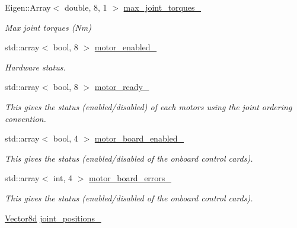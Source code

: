 \begin{DoxyCompactItemize}
Eigen\+::\+Array$<$ double, 8, 1 $>$ \hyperlink{classblmc__robots_1_1Solo8TI_a9eca8246a28a6f2f2d1deff52228e69f}{max\+\_\+joint\+\_\+torques\+\_\+}
\begin{DoxyCompactList}\small\item\em Max joint torques (Nm) \end{DoxyCompactList}\item 
std\+::array$<$ bool, 8 $>$ \hyperlink{classblmc__robots_1_1Solo8TI_a3dbd4bd26b5a4273e94ced22d43a9890}{motor\+\_\+enabled\+\_\+}
\begin{DoxyCompactList}\small\item\em Hardware status. \end{DoxyCompactList}\item 
\mbox{\label{classblmc__robots_1_1Solo8TI_a604140f307df2c420c29990948fdbd38}} 
std\+::array$<$ bool, 8 $>$ \hyperlink{classblmc__robots_1_1Solo8TI_a604140f307df2c420c29990948fdbd38}{motor\+\_\+ready\+\_\+}
\begin{DoxyCompactList}\small\item\em This gives the status (enabled/disabled) of each motors using the joint ordering convention. \end{DoxyCompactList}\item 
\mbox{\label{classblmc__robots_1_1Solo8TI_a9471bb2684e782adfc1a8db58ba9c18e}} 
std\+::array$<$ bool, 4 $>$ \hyperlink{classblmc__robots_1_1Solo8TI_a9471bb2684e782adfc1a8db58ba9c18e}{motor\+\_\+board\+\_\+enabled\+\_\+}
\begin{DoxyCompactList}\small\item\em This gives the status (enabled/disabled of the onboard control cards). \end{DoxyCompactList}\item 
\mbox{\label{classblmc__robots_1_1Solo8TI_a3621a7c3174f44ba3051577588d55c88}} 
std\+::array$<$ int, 4 $>$ \hyperlink{classblmc__robots_1_1Solo8TI_a3621a7c3174f44ba3051577588d55c88}{motor\+\_\+board\+\_\+errors\+\_\+}
\begin{DoxyCompactList}\small\item\em This gives the status (enabled/disabled of the onboard control cards). \end{DoxyCompactList}\item 
\hyperlink{common__header_8hpp_a98975ffbe0bca1296078e0350dfedd60}{Vector8d} \hyperlink{classblmc__robots_1_1Solo8TI_a6ca7d08522f038dc47d6a97f937c6f75}{joint\+\_\+positions\+\_\+}

\end{DoxyCompactItemize}
